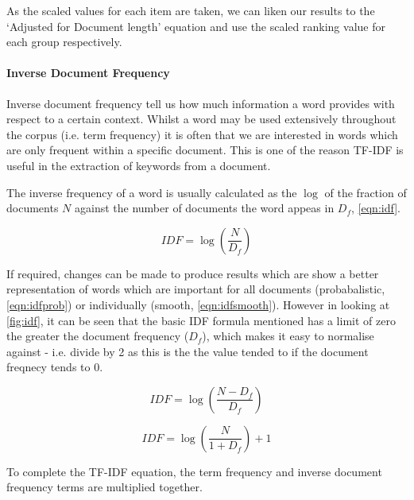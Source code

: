 As the scaled values for each item are taken, we can liken our results to the `Adjusted for Document length' equation and use the scaled ranking value for each group respectively.

\paragraph*{Inverse Document Frequency}
Inverse document frequency tell us how much information a word provides with respect to a certain context. Whilst a word may be used extensively throughout the corpus (i.e. term frequency) it is often that we are interested in words which are only frequent within a specific document. This is one of the reason TF-IDF is useful in the extraction of keywords from a document. 

The inverse frequency of a word is usually calculated as the $\log$ of the fraction of documents $N$ against the number of documents the word appeas in $D_f$, \autoref{eqn:idf}.


\begin{equation}
    IDF = \log(\frac{N}{D_f})
    \label{eqn:idf}
\end{equation}

If required, changes can be made to produce results which are show a better representation of words which are important for all documents (probabalistic, \autoref{eqn:idfprob}) or individually (smooth, \autoref{eqn:idfsmooth}). However in looking at \autoref{fig:idf}, it can be seen that the basic IDF formula mentioned has a limit of zero the greater the document frequency ($D_f$), which makes it easy to normalise against - i.e. divide by 2 as this is the the value tended to if the document freqnecy tends to 0.    


\begin{equation}
    IDF = \log(\frac{N-D_f}{D_f})
    \label{eqn:idfprob}
\end{equation}

\begin{equation}
    IDF = \log(\frac{N}{1+D_f})+1
    \label{eqn:idfsmooth}
\end{equation}




To complete the TF-IDF equation, the term frequency and inverse document frequency terms are multiplied together. 

